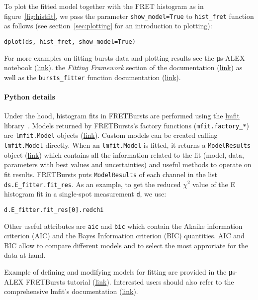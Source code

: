 To plot the fitted model together with the FRET histogram as in 
figure~\ref{fig:histfit}, we pass the parameter \verb|show_model=True| 
to \verb|hist_fret| function as follows 
(see section~\ref{sec:plotting} for an introduction to plotting):

\begin{lstlisting}
dplot(ds, hist_fret, show_model=True)
\end{lstlisting}

For more examples on fitting bursts data and plotting results see the
μs-ALEX notebook (\href{http://nbviewer.jupyter.org/github/tritemio/FRETBursts_notebooks/blob/master/notebooks/FRETBursts%20-%20us-ALEX%20smFRET%20burst%20analysis.ipynb}{link}).
the \textit{Fitting Framework} section of the documentation 
(\href{http://fretbursts.readthedocs.org/en/latest/fit.html}{link})
as well as the \verb|bursts_fitter| function documentation
(\href{http://fretbursts.readthedocs.org/en/latest/plugins.html#fretbursts.burstlib_ext.bursts_fitter}{link}).

\paragraph{Python details}
Under the hood, histogram fits in FRETBursts are performed using the
\href{http://lmfit.github.io/lmfit-py/}{lmfit} library~\cite{lmfit}.
Models returned by FRETBursts's factory functions (\verb|mfit.factory_*|) 
are \verb|lmfit.Model| objects (\href{https://lmfit.github.io/lmfit-py/model.html}{link}).
Custom models can be created calling \verb|lmfit.Model| directly.
When an \verb|lmfit.Model| is fitted, it returns a \verb|ModelResults| object 
(\href{https://lmfit.github.io/lmfit-py/model.html#the-modelresult-class}{link})
which contains all the information related to the fit (model, data, 
parameters with best values and uncertainties) and useful methods to operate on fit results. 
FRETBursts puts \verb|ModelResults| of each channel in the list 
\verb|ds.E_fitter.fit_res|.
As an example, to get the reduced $\chi^2$ value of the E histogram fit in a 
single-spot measurement \verb|d|, we use:

\begin{lstlisting}
d.E_fitter.fit_res[0].redchi
\end{lstlisting}

Other useful attributes are \verb|aic| and \verb|bic| which contain the 
Akaike information criterion (AIC) and the Bayes Information criterion (BIC)
quantities. AIC and BIC allow to compare different models and
to select the most approriate for the data at hand.

Example of defining and modifying models for fitting are provided in 
the μs-ALEX FRETBursts tutorial (\href{http://nbviewer.jupyter.org/github/tritemio/FRETBursts_notebooks/blob/master/notebooks/FRETBursts%20-%20us-ALEX%20smFRET%20burst%20analysis.ipynb}{link}). 
Interested users should also refer to the comprehensive lmfit's documentation
(\href{http://lmfit.github.io/lmfit-py/}{link}).
